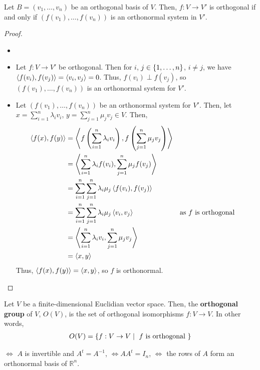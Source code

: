 \documentclass[letterpaper,12pt]{article}
\begin{document}
\begin{theorem}
Let $B = (v_1, \dots, v_n)$ be an orthogonal basis of $V$. Then, $f: V \rightarrow V'$ is orthogonal if and only if $(f(v_1), \dots, f(v_n))$ is an orthonormal system in $V'$.
\end{theorem}
\begin{proof}
\begin{itemize}
    \item[]
    \item Let $f: V \rightarrow V'$ be orthogonal. Then for $i$, $j \in \left\{ 1, \dots, n \right\}$, $i \neq j$, we have $\left< f(v_i), f(v_j) \right> = \left< v_i, v_j \right> = 0$. Thus, $f(v_i) \perp f(v_j)$, so $(f(v_1), \dots, f(v_n))$ is an orthonormal system for $V'$.
    \item Let $(f(v_1), \dots, f(v_n))$ be an orthonormal system for $V'$. Then, let $x = \sum_{i=1}^n \lambda_i v_i$, $y = \sum_{j=1}^n \mu_j v_j \in V$. Then,
    \begin{align*}
        \left< f(x), f(y) \right> & = \left< f \left(\sum_{i=1}^n \lambda_i v_i \right), f \left(\sum_{j=1}^n \mu_j v_j \right) \right> \\
        & = \left< \sum_{i=1}^n \lambda_i f(v_i), \sum_{j=1}^n \mu_j f(v_j) \right> \\
        & = \sum_{i=1}^n \sum_{j=1}^n \lambda_i \mu_j \left< f(v_i), f(v_j) \right> \\
        & = \sum_{i=1}^n \sum_{j=1}^n \lambda_i \mu_j \left< v_i, v_j \right> && \text{as $f$ is orthogonal} \\
        & = \left< \sum_{i=1}^n \lambda_i v_i, \sum_{j=1}^n \mu_j v_j \right> \\
        & = \left< x, y \right>
    \end{align*}
    Thus, $\left< f(x), f(y) \right> = \left< x, y \right>$, so $f$ is orthonormal.
\end{itemize}
\end{proof}

\begin{definition}
Let $V$ be a finite-dimensional Euclidian vector space. Then, the \textbf{orthogonal group} of $V$, $O(V)$, is the set of orthogonal isomorphisms $f: V \rightarrow V$. In other words,
\begin{align*}
    O(V) = \left\{ f: V \rightarrow V \mid \text{ $f$ is orthogonal } \right\}
\end{align*}
\end{definition}




$\iff$ $A$ is invertible and $A^t = A^{-1}$, $\iff A A^t = I_n$, $\iff$ the rows of $A$ form an orthonormal basis of $\mathbb{R}^n$.
\end{document}
